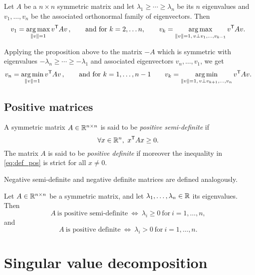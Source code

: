 \documentclass[11pt,nocut]{article}
\begin{document}
\begin{proposition}\label{prop:eigen_var}
	Let $A$ be a $n \times n$ symmetric matrix and let $\lambda_1 \geq \cdots \geq \lambda_n$ be its $n$ eigenvalues and $v_1, \dots, v_n$ be the associated orthonormal family of eigenvectors. Then 
	$$
	v_1 = \operatorname*{arg\,max}_{\|v\| = 1} v^{{\sf T}} A v\,,
	\qquad \text{and for} \ k=2, \dots n, \qquad
	v_{k} = \operatorname*{arg\,max}_{\|v\| = 1, \, v \perp v_1, \dots, v_{k-1}} v^{{\sf T}} A v.
	$$
\end{proposition}

\begin{remark} Applying the proposition above to the matrix $-A$ which is symmetric with eigenvalues $-\lambda_n \geq \cdots \geq -\lambda_1$ and associated eigenvectors $v_n, \dots, v_1$, we get
	$$
	v_n = \operatorname*{arg\,min}_{\|v\| = 1} v^{{\sf T}} A v\,,
	\qquad \text{and for} \ k=1, \dots , n-1 \qquad
	v_{k} = \operatorname*{arg\,min}_{\|v\| = 1, \, v \perp v_{k+1}, \dots, v_{n}} v^{{\sf T}} A v.
	$$
\end{remark}

\subsection{Positive matrices}

\begin{definition}
	A symmetric matrix $A \in \mathbb{R}^{n \times n}$ is said to be \emph{positive semi-definite} if 
	\begin{equation}\label{eq:def_pos}
		\forall x \in \mathbb{R}^n, \ x^{{\sf T}} A x \geq 0.
	\end{equation}
	The matrix $A$ is said to be \emph{positive definite} if moreover the inequality in \eqref{eq:def_pos} is strict for all $x \neq 0$.
\end{definition}
\begin{remark}
	Negative semi-definite and negative definite matrices are defined analogously.
\end{remark}

\begin{proposition}
	Let $A \in \mathbb{R}^{n \times n}$ be a symmetric matrix, and let $\lambda_1, \dots,\lambda_n \in \mathbb{R}$ its eigenvalues. Then
	$$
	A \ \text{is positive semi-definite} \ \Longleftrightarrow \
	\lambda_i \geq 0 \ \text{for} \ i = 1, \dots, n,
	$$
	and
	$$
	A \ \text{is positive definite} \ \Longleftrightarrow \
	\lambda_i > 0 \ \text{for} \ i = 1, \dots, n.
	$$
\end{proposition}

\section{Singular value decomposition}
\end{document}
